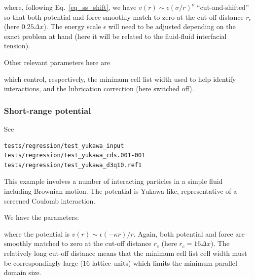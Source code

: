 




where, following Eq.~\ref{eq_ss_shift}, we have
$v(r) \sim \epsilon (\sigma /r)^\nu$ ``cut-and-shifted'' so that
both potential and force smoothly match to zero at the cut-off
distance $r_c$ (here $0.25\Delta x$). The energy scale $\epsilon$
will need to be adjusted depending on the exact problem at hand
(here it will be related to the fluid-fluid interfacial tension).

Other relevant parameters here are



which control, respectively, the minimum cell list width used to
help identify interactions, and the lubrication correction (here
switched off).


\subsubsection{Short-range potential}

See
\begin{verbatim}
tests/regression/test_yukawa_input
tests/regression/test_yukawa_cds.001-001
tests/regression/test_yukawa_d3q10.ref1
\end{verbatim}

This example involves a number of interacting particles in a simple
fluid including Brownian motion. The potential is Yukawa-like,
representative of a screened Coulomb interaction.

We have the parameters:





where the potential is $v(r) \sim \epsilon (-\kappa r) / r$. Again,
both potential and force are smoothly matched to zero at the
cut-off distance $r_c$ (here $r_c = 16\Delta x$). The relatively
long cut-off distance means that the minimum cell list cell width
must be correspondingly large (16 lattice units) which limits the
minimum parallel domain size.

